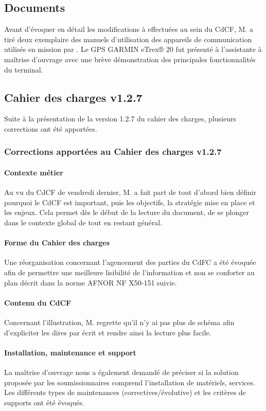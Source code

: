 \documentclass[11pt,fleqn]{report}
\begin{document}
\subsection{Documents}
Avant d'évoquer en détail les modifications à effectuées au sein du CdCF, M.  \Agopian a tiré deux exemplaire des manuels d'utilisation des appareils de communication  utilisés en mission par \mo. Le GPS GARMIN eTrex® 20 fut présenté à l'assistante à maîtrise d'ouvrage avec une brève démonstration des principales fonctionnalités du terminal.

\subsection{Cahier des charges v1.2.7}
Suite à la présentation de la version 1.2.7 du cahier des charges, plusieurs corrections ont été apportées.

\subsubsection{Corrections apportées au Cahier des charges v1.2.7}

\paragraph{Contexte métier}
Au vu du CdCF de vendredi dernier, M. \Agopian a fait part de tout d'abord bien définir pourquoi le CdCF est important, puis les objectifs, la stratégie mise en place et les enjeux. Cela permet dès le début de la lecture du document, de se \og plonger \fg{} dans le contexte global de \mo tout en restant général.

\paragraph{Forme du Cahier des charges}
Une réorganisation concernant l'agencement des parties du CdFC a été évoquée afin de permettre une meilleure lisibilité de l'information et non se conforter au plan décrit dans la norme AFNOR NF X50-151 suivie.

\paragraph{Contenu du CdCF}
Concernant l'illustration, M. \Agopian regrette qu'il n'y ai pas plus de schéma afin d'expliciter les dires par écrit et rendre ainsi la lecture plus facile.

\paragraph{Installation, maintenance et support}
La maîtrise d'ouvrage nous a également demandé de préciser si la solution proposée par les soumissionnaires comprend l'installation de matériels, services.
Les différents types de maintenances (correctives/évolutive) et les critères de supports ont été évoqués.
\end{document}
